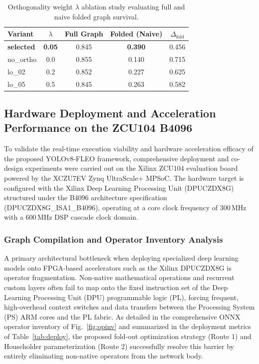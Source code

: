 \documentclass[algorithms,article,submit,moreauthors]{Definitions/mdpi}
\begin{document}
\begin{table}[h!]
\centering
\caption{Orthogonality weight $\lambda$ ablation study evaluating full and naive folded graph survival.}
\label{tab:ablation}
\setlength{\tabcolsep}{6pt}\renewcommand{\arraystretch}{1.2}
\begin{tabular}{lcccc}
\toprule
Variant & $\lambda$ & Full Graph & Folded (Naive) & $\Delta_{\mathrm{fold}}$\\
\midrule
\textbf{selected} & \textbf{0.05} & 0.845 & \textbf{0.390} & 0.456\\
no\_ortho & 0.0 & 0.855 & 0.140 & 0.715\\
lo\_02 & 0.2 & 0.852 & 0.227 & 0.625\\
lo\_05 & 0.5 & 0.845 & 0.263 & 0.582\\
\bottomrule
\end{tabular}
\end{table}


\subsection{Hardware Deployment and Acceleration Performance on the ZCU104 B4096}
\label{sec:deploy-results}

To validate the real-time execution viability and hardware acceleration efficacy of the proposed YOLOv8-FLEO framework, comprehensive deployment and co-design experiments were carried out on the Xilinx ZCU104 evaluation board powered by the XCZU7EV Zynq UltraScale+ MPSoC. The hardware target is configured with the Xilinx Deep Learning Processing Unit (DPUCZDX8G) structured under the B4096 architecture specification (DPUCZDX8G\_ISA1\_B4096), operating at a core clock frequency of $300\,\text{MHz}$ with a $600\,\text{MHz}$ DSP cascade clock domain. 

\subsubsection{Graph Compilation and Operator Inventory Analysis}

A primary architectural bottleneck when deploying specialized deep learning models onto FPGA-based accelerators such as the Xilinx DPUCZDX8G is operator fragmentation. Non-native mathematical operations and recurrent custom layers often fail to map onto the fixed instruction set of the Deep Learning Processing Unit (DPU) programmable logic (PL), forcing frequent, high-overhead context switches and data transfers between the Processing System (PS) ARM cores and the PL fabric. As detailed in the comprehensive ONNX operator inventory of Fig.~\ref{fig:opinv} and summarized in the deployment metrics of Table~\ref{tab:deploy}, the proposed fold-out optimization strategy (Route 1) and Householder parameterization (Route 2) successfully resolve this barrier by entirely eliminating non-native operators from the network body.
\end{document}
